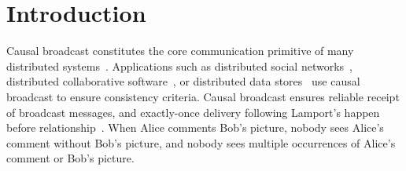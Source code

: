  
\section{Introduction}

Causal broadcast constitutes the core communication primitive of many
distributed systems~\cite{hadzilacos1994modular}. Applications such as
distributed social networks~\cite{borthakur2013petabyte}, distributed
collaborative software~\cite{heinrich2012exploiting,nedelec2016crate}, or
distributed data
stores~\cite{bailis2013bolton,bravo2017saturn,demers1987epidemic,lloyd2011cops,shapiro2011comprehensive}
use causal broadcast to ensure consistency criteria.  Causal broadcast ensures
reliable receipt of broadcast messages, and exactly-once delivery following
Lamport's happen before relationship~\cite{lamport1978time}. When Alice comments
Bob's picture, nobody sees Alice's comment without Bob's picture, and nobody
sees multiple occurrences of Alice's comment or Bob's picture.

